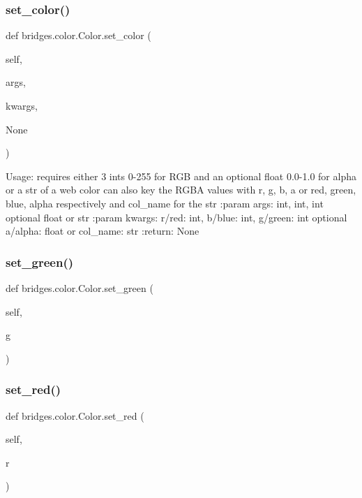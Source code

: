 \subsubsection{\texorpdfstring{set\+\_\+color()}{set\_color()}}
{\footnotesize\ttfamily def bridges.\+color.\+Color.\+set\+\_\+color (\begin{DoxyParamCaption}\item[{}]{self,  }\item[{}]{args,  }\item[{}]{kwargs,  }\item[{}]{None }\end{DoxyParamCaption})}

\begin{DoxyVerb}Usage: requires either 3 ints 0-255 for RGB and an optional float 0.0-1.0 for alpha or a str of a web color
can also key the RGBA values with r, g, b, a or red, green, blue, alpha respectively and col_name for the str
:param args: int, int, int optional float or str
:param kwargs: r/red: int, b/blue: int, g/green: int optional a/alpha: float or col_name: str
:return: None
\end{DoxyVerb}
 \mbox{\label{classbridges_1_1color_1_1_color_a321743b2baebea451a7fc1428414545e}} 
\subsubsection{\texorpdfstring{set\+\_\+green()}{set\_green()}}
{\footnotesize\ttfamily def bridges.\+color.\+Color.\+set\+\_\+green (\begin{DoxyParamCaption}\item[{}]{self,  }\item[{}]{g }\end{DoxyParamCaption})}

\mbox{\label{classbridges_1_1color_1_1_color_a9b5c8db77c60c49dabf55aa634930704}} 
\subsubsection{\texorpdfstring{set\+\_\+red()}{set\_red()}}
{\footnotesize\ttfamily def bridges.\+color.\+Color.\+set\+\_\+red (\begin{DoxyParamCaption}\item[{}]{self,  }\item[{}]{r }\end{DoxyParamCaption})}



